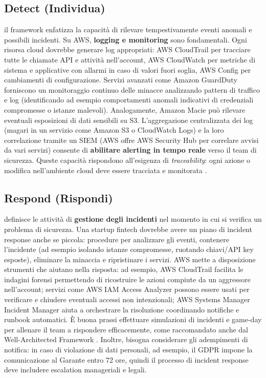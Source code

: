 \documentclass[a4paper,12pt]{report}
\begin{document}
\subsection{Detect (Individua)}
\label{subsec:nist_csf_detect}
il framework enfatizza la capacità di rilevare tempestivamente eventi anomali e possibili incidenti. Su AWS, \textbf{logging e monitoring} sono fondamentali. Ogni risorsa cloud dovrebbe generare log appropriati: AWS CloudTrail per tracciare tutte le chiamate API e attività nell'account, AWS CloudWatch per metriche di sistema e applicative con allarmi in caso di valori fuori soglia, AWS Config per cambiamenti di configurazione. Servizi avanzati come Amazon GuardDuty forniscono un monitoraggio continuo delle minacce analizzando pattern di traffico e log (identificando ad esempio comportamenti anomali indicativi di credenziali compromesse o istanze malevoli). Analogamente, Amazon Macie può rilevare eventuali esposizioni di dati sensibili su S3. L'aggregazione centralizzata dei log (magari in un servizio come Amazon S3 o CloudWatch Logs) e la loro correlazione tramite un SIEM (AWS offre AWS Security Hub per correlare avvisi da vari servizi) consente di \textbf{abilitare alerting in tempo reale} verso il team di sicurezza. Queste capacità rispondono all'esigenza di \textit{traceability}: ogni azione o modifica nell'ambiente cloud deve essere tracciata e monitorata \cite{awsWellArchitected}.

\subsection{Respond (Rispondi)}
\label{subsec:nist_csf_respond}
definisce le attività di \textbf{gestione degli incidenti} nel momento in cui si verifica un problema di sicurezza. Una startup fintech dovrebbe avere un piano di incident response anche se piccola: procedure per analizzare gli eventi, contenere l'incidente (ad esempio isolando istanze compromesse, ruotando chiavi/API key esposte), eliminare la minaccia e ripristinare i servizi. AWS mette a disposizione strumenti che aiutano nella risposta: ad esempio, AWS CloudTrail facilita le indagini forensi permettendo di ricostruire le azioni compiute da un aggressore nell'account; servizi come AWS IAM Access Analyzer possono essere usati per verificare e chiudere eventuali accessi non intenzionali; AWS Systems Manager Incident Manager aiuta a orchestrare la risoluzione coordinando notifiche e runbook automatici. È buona prassi effettuare simulazioni di incidenti e game-day per allenare il team a rispondere efficacemente, come raccomandato anche dal Well-Architected Framework \cite{awsWellArchitected}. Inoltre, bisogna considerare gli adempimenti di notifica: in caso di violazione di dati personali, ad esempio, il GDPR impone la comunicazione al Garante entro 72 ore, quindi il processo di incident response deve includere escalation manageriali e legali.
\end{document}
